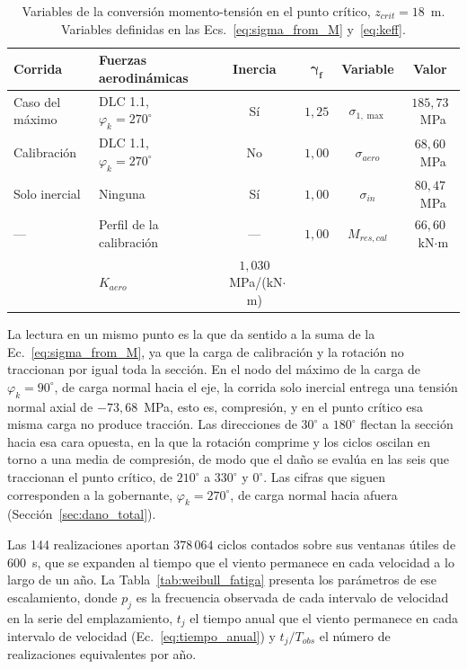 \begin{table}[H]
    \centering
    \caption{Variables de la conversión momento-tensión en el punto crítico, $z_{crit} = 18$~m. Variables definidas en las Ecs.~\ref{eq:sigma_from_M} y~\ref{eq:keff}.}
    \label{tab:calibracion_fatiga}
    \begin{tabular}{>{\raggedright\arraybackslash}p{2.6cm}>{\raggedright\arraybackslash}p{3.3cm}cccc}
        \hline
        \textbf{Corrida} & \textbf{Fuerzas aerodinámicas} & \textbf{Inercia} & $\boldsymbol{\gamma_f}$ & \textbf{Variable} & \textbf{Valor} \\
        \hline
        Caso del máximo & DLC 1.1, $\varphi_k = 270^\circ$ & Sí & $1{,}25$ & $\sigma_{1,\max}$ & $185{,}73$~MPa \\
        Calibración & DLC 1.1, $\varphi_k = 270^\circ$ & No & $1{,}00$ & $\sigma_{aero}$ & $68{,}60$~MPa \\
        Solo inercial & Ninguna & Sí & $1{,}00$ & $\sigma_{in}$ & $80{,}47$~MPa \\
        --- & Perfil de la calibración & --- & $1{,}00$ & $M_{res,cal}$ & $66{,}60$~kN$\cdot$m \\
        \hline
        \multicolumn{4}{l}{Factor momento-tensión, Ec.~\ref{eq:keff}} & $K_{aero}$ & $1{,}030$~MPa/(kN$\cdot$m) \\
        \hline
    \end{tabular}
\end{table}

La lectura en un mismo punto es la que da sentido a la suma de la Ec.~\ref{eq:sigma_from_M}, ya que la carga de calibración y la rotación no traccionan por igual toda la sección. En el nodo del máximo de la carga de $\varphi_k = 90^\circ$, de carga normal hacia el eje, la corrida solo inercial entrega una tensión normal axial de $-73{,}68$~MPa, esto es, compresión, y en el punto crítico esa misma carga no produce tracción. Las direcciones de $30^\circ$ a $180^\circ$ flectan la sección hacia esa cara opuesta, en la que la rotación comprime y los ciclos oscilan en torno a una media de compresión, de modo que el daño se evalúa en las seis que traccionan el punto crítico, de $210^\circ$ a $330^\circ$ y $0^\circ$. Las cifras que siguen corresponden a la gobernante, $\varphi_k = 270^\circ$, de carga normal hacia afuera (Sección~\ref{sec:dano_total}).

Las 144 realizaciones aportan $378\,064$ ciclos contados sobre sus ventanas útiles de $600$~s, que se expanden al tiempo que el viento permanece en cada velocidad a lo largo de un año. La Tabla~\ref{tab:weibull_fatiga} presenta los parámetros de ese escalamiento, donde $p_j$ es la frecuencia observada de cada intervalo de velocidad en la serie del emplazamiento, $t_j$ el tiempo anual que el viento permanece en cada intervalo de velocidad (Ec.~\ref{eq:tiempo_anual}) y $t_j/T_{obs}$ el número de realizaciones equivalentes por año.

